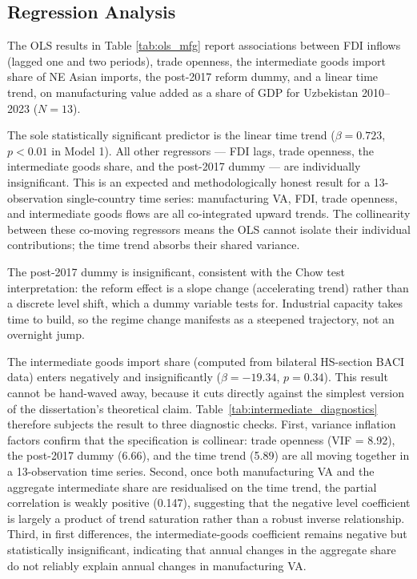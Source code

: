 \documentclass[14pt,a4paper]{extarticle}
\begin{document}
\newpage


\subsection{Regression Analysis}\label{sec:regression}





The OLS results in Table \ref{tab:ols_mfg} report associations between FDI inflows (lagged one and two periods), trade openness, the intermediate goods import share of NE Asian imports, the post-2017 reform dummy, and a linear time trend, on manufacturing value added as a share of GDP for Uzbekistan 2010--2023 ($N = 13$).

The sole statistically significant predictor is the linear time trend ($\beta = 0.723$, $p < 0.01$ in Model 1). All other regressors --- FDI lags, trade openness, the intermediate goods share, and the post-2017 dummy --- are individually insignificant. This is an expected and methodologically honest result for a 13-observation single-country time series: manufacturing VA, FDI, trade openness, and intermediate goods flows are all co-integrated upward trends. The collinearity between these co-moving regressors means the OLS cannot isolate their individual contributions; the time trend absorbs their shared variance.

The post-2017 dummy is insignificant, consistent with the Chow test interpretation: the reform effect is a slope change (accelerating trend) rather than a discrete level shift, which a dummy variable tests for. Industrial capacity takes time to build, so the regime change manifests as a steepened trajectory, not an overnight jump.

The intermediate goods import share (computed from bilateral HS-section BACI data) enters negatively and insignificantly ($\beta = -19.34$, $p = 0.34$). This result cannot be hand-waved away, because it cuts directly against the simplest version of the dissertation's theoretical claim. Table~\ref{tab:intermediate_diagnostics} therefore subjects the result to three diagnostic checks. First, variance inflation factors confirm that the specification is collinear: trade openness (VIF = 8.92), the post-2017 dummy (6.66), and the time trend (5.89) are all moving together in a 13-observation time series. Second, once both manufacturing VA and the aggregate intermediate share are residualised on the time trend, the partial correlation is weakly positive (0.147), suggesting that the negative level coefficient is largely a product of trend saturation rather than a robust inverse relationship. Third, in first differences, the intermediate-goods coefficient remains negative but statistically insignificant, indicating that annual changes in the aggregate share do not reliably explain annual changes in manufacturing VA.
\end{document}
